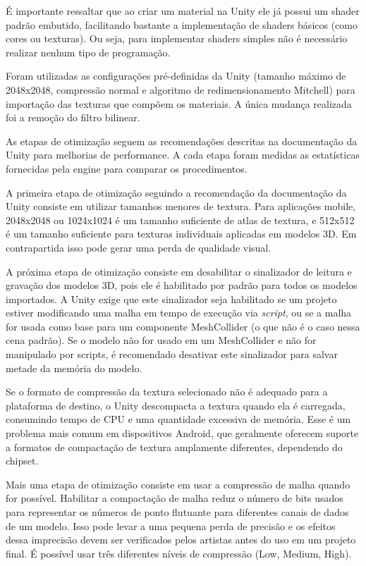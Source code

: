 É importante ressaltar que ao criar um material na Unity ele já possui um shader padrão embutido, facilitando bastante a implementação de shaders básicos (como cores ou texturas). Ou seja, para implementar shaders simples não é necessário realizar nenhum tipo de programação.

Foram utilizadas as configurações pré-definidas da Unity (tamanho máximo de 2048x2048, compressão normal e algoritmo de redimensionamento Mitchell) para importação das texturas que compõem os materiais. A única mudança realizada foi a remoção do filtro bilinear.

As etapas de otimização seguem as recomendações descritas na documentação da Unity para melhorias de performance. A cada etapa foram medidas as estatísticas fornecidas pela engine para comparar os procedimentos.

A primeira etapa de otimização seguindo a recomendação da documentação da Unity consiste em utilizar tamanhos menores de textura. Para aplicações mobile, 2048x2048 ou 1024x1024 é um tamanho suficiente de atlas de textura, e 512x512 é um tamanho suficiente para texturas individuais aplicadas em modelos 3D. Em contrapartida isso pode gerar uma perda de qualidade visual.

A próxima etapa de otimização consiste em desabilitar o sinalizador de leitura e gravação dos modelos 3D, pois ele é habilitado por padrão para todos os modelos importados. A Unity exige que este sinalizador seja habilitado se um projeto estiver modificando uma malha em tempo de execução via \textit{script}, ou se a malha for usada como base para um componente MeshCollider (o que não é o caso nessa cena padrão). Se o modelo não for usado em um MeshCollider e não for manipulado por scripts, é recomendado desativar este sinalizador para salvar metade da memória do modelo.

Se o formato de compressão da textura selecionado não é adequado para a plataforma de destino, o Unity descompacta a textura quando ela é carregada, consumindo tempo de CPU e uma quantidade excessiva de memória. Esse é um problema mais comum em dispositivos Android, que geralmente oferecem suporte a formatos de compactação de textura amplamente diferentes, dependendo do chipset.

Mais uma etapa de otimização consiste em usar a compressão de malha quando for possível.  Habilitar a compactação de malha reduz o número de bits usados para representar os números de ponto flutuante para diferentes canais de dados de um modelo. Isso pode levar a uma pequena perda de precisão e os efeitos dessa imprecisão devem ser verificados pelos artistas antes do uso em um projeto final. É possível usar três diferentes níveis de compressão (Low, Medium, High).

